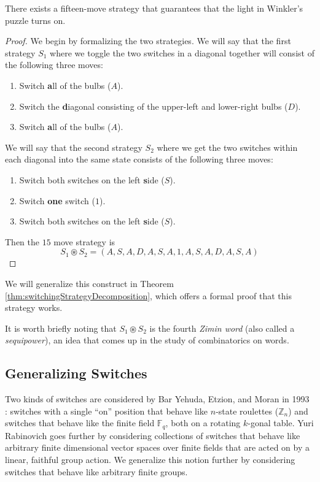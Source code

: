 \begin{proposition}
  There exists a fifteen-move strategy that guarantees that the light in
  Winkler's puzzle turns on.
\end{proposition}
\begin{proof}
  We begin by formalizing the two strategies. We will say that the first
  strategy $S_1$ where we toggle the two switches in a diagonal together
  will consist of the following three moves: \begin{enumerate}
    \item Switch \textbf{a}ll of the bulbs ($A$).
    \item Switch the \textbf{d}iagonal consisting of the upper-left and lower-right bulbs ($D$).
    \item Switch \textbf{a}ll of the bulbs ($A$).
  \end{enumerate}
  We will say that the second strategy $S_2$ where we get the two switches
  within each diagonal into the same state consists of the following three
  moves: \begin{enumerate}
    \item Switch both switches on the left \textbf{s}ide ($S$).
    \item Switch \textbf{one} switch ($1$).
    \item Switch both switches on the left \textbf{s}ide ($S$).
  \end{enumerate}
  Then the $15$ move strategy is \[
    S_1 \circledast S_2 = (A, S, A, D, A, S, A, 1, A, S, A, D, A, S, A)
  \]
\end{proof}

We will generalize this construct in
Theorem \ref{thm:switchingStrategyDecomposition},
which offers a formal proof that this strategy works.

It is worth briefly noting that $S_1 \circledast S_2$ is the fourth
\textit{Zimin word} (also called a \textit{sequipower}),
an idea that comes up in the study of combinatorics on words.

\subsection{Generalizing Switches}
Two kinds of switches are considered by Bar Yehuda, Etzion, and Moran in 1993
\cite{BarYehuda1993}: switches with a single ``on'' position that behave like
$n$-state roulettes ($\mathbb Z_n$) and switches that behave like
the finite field $\mathbb F_q$, both on a rotating $k$-gonal table.
Yuri Rabinovich \cite{Rabinovich2022} goes further by considering collections
of switches that behave like arbitrary finite dimensional vector spaces over
finite fields that are acted on by a linear, faithful group action.
We generalize this notion further by considering switches that behave like
arbitrary finite groups.

